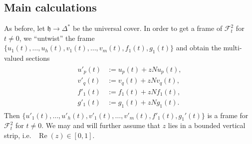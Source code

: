 \subsection{Main calculations}
As before, let \(\mathfrak{h}\to \Delta^{\ast}\) be the 
universal cover.
In order to get a frame of \(\mathcal{F}_{t}^{2}\) for \(t\ne 0\), we ``untwist''
the frame \(\{u_{1}(t),\ldots,u_{h}(t),v_{1}(t),\ldots,v_{m}(t),f_{1}(t),g_{1}(t)\}\) 
and obtain the multi-valued sections
\begin{align}
\begin{split}
u'_{p}(t)&:=u_{p}(t)+zNu_{p}(t),\\
v'_{q}(t)&:=v_{q}(t)+zNv_{q}(t),\\
f'_{1}(t)&:=f_{1}(t)+zNf_{1}(t),\\
g'_{1}(t)&:=g_{1}(t)+zNg_{1}(t).
\end{split}
\end{align}
Then \(\{u'_{1}(t),\ldots,u'_{h}(t),
v'_{1}(t),\ldots,v'_{m}(t),f'_{1}(t),g_{1}'(t)\}\) 
is a frame for \(\mathcal{F}^{2}_{t}\)
for \(t\ne 0\). We may and will further assume that 
\(z\) lies in a bounded vertical strip, i.e.~
\(\operatorname{Re}(z)\in[0,1]\).

